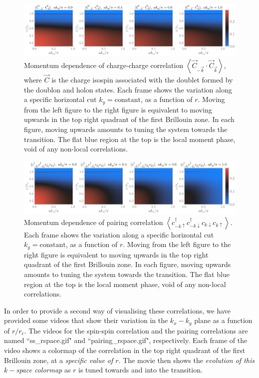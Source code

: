 \documentclass{report}
\numberwithin{equation}{section}
\begin{document}
\begin{figure}[!htb]
\centering
\includegraphics[width=\textwidth]{charge_kspace_all.pdf}
\caption{Momentum dependence of charge-charge correlation \(\left<\vec{C}_{-\vec k}\cdot\vec{C}_{\vec k} \right>\), where \(\vec C\) is the charge isospin associated with the doublet formed by the doublon and holon states. Each frame shows the variation along a specific horizontal cut \(k_y=\text{constant}\), as a function of \(r\). Moving from the left figure to the right figure is equivalent to moving upwards in the top right quadrant of the first Brillouin zone. In each figure, moving upwards amounts to tuning the system towards the transition. The flat blue region at the top is the local moment phase, void of any non-local correlations.}
\label{charge_kspace}
\end{figure}

\begin{figure}[!htb]
\includegraphics[width=\textwidth]{pair_kspace_all.pdf}
\caption{Momentum dependence of pairing correlation \(\left<c^\dagger_{-k\uparrow}c^\dagger_{-k\downarrow}c_{k\downarrow}c_{k\uparrow}\right>\). Each frame shows the variation along a specific horizontal cut \(k_y=\text{constant}\), as a function of \(r\). Moving from the left figure to the right figure is equivalent to moving upwards in the top right quadrant of the first Brillouin zone. In each figure, moving upwards amounts to tuning the system towards the transition. The flat blue region at the top is the local moment phase, void of any non-local correlations.}
\label{pair_kspace}
\end{figure}

{\color{blue} In order to provide a second way of visualising these correlations, we have provided some videos that show their variation in the \(k_x-k_y\) plane as a function of \(r/r_c\). The videos for the spin-spin correlation and the pairing correlations are named ``ss\_rspace.gif" and ``pairing\_rspace.gif", respectively. Each frame of the video shows a colormap of the correlation in the top right quadrant of the first Brillouin zone, at a {\it specific value of \(r\)}. The movie then shows the {\it evolution of this \(k-\)space colormap} as \(r\) is tuned towards and into the transition.}
\end{document}
